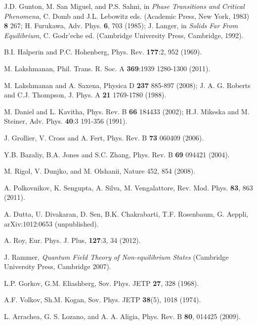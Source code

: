 \documentclass[a4paper,11pt,color]{article}
\renewenvironment{thebibliography}[1]{%
    \begin{oldthebibliography}{#1}%
      \setlength{\parskip}{0ex}%
      \setlength{\itemsep}{0ex}%
  }%
  {%
    \end{oldthebibliography}%
  }
\begin{document}
      
%
%
\begin{thebibliography}{}

J.D. Gunton, M. San Miguel, and P.S. Sahni, in \textit{Phase Transitions and Critical Phenomena}, C. Domb
and J.L. Lebowitz eds. (Academic Press, New York, 1983)  {\bf 8} 267; H. Furukawa, Adv. Phys. {\bf 6}, 703 (1985);
J. Langer, in \textit{Solids Far From Equilibrium}, C. Godr'eche ed. (Cambridge University Press, Cambridge, 1992).

B.I. Halperin and P.C. Hohenberg, Phys. Rev. {\bf 177}:2, 952 (1969).

M. Lakshmanan,  Phil. Trans. R. Soc. A {\bf 369}:1939 1280-1300 (2011).

M. Lakshmanan and A. Saxena, Physica D {\bf 237} 885-897 (2008); J. A. G. Roberts and C.J. Thompson, J. Phys. A {\bf 21} 1769-1780 (1988).

M. Daniel and L. Kavitha, Phys. Rev. B {\bf 66} 184433 (2002); H.J. Mikeska and M. Steiner, Adv. Phys. {\bf40}:3 191-356 (1991). 

J. Grollier, V. Cross  and A. Fert, Phys. Rev. B {\bf 73} 060409 (2006).

Y.B. Bazaliy, B.A. Jones and S.C. Zhang, Phys. Rev. B {\bf 69} 094421 (2004).

M. Rigol, V. Dunjko, and M. Olshanii, Nature 452, 854 (2008).

A. Polkovnikov, K. Sengupta, A. Silva, M. Vengalattore, Rev. Mod. Phys. \textbf{83}, 863 (2011).

A. Dutta, U. Divakaran, D. Sen, B.K. Chakrabarti, T.F. Rosenbaum, G. Aeppli, arXiv:1012:0653 (unpublished).

A. Roy, Eur. Phys. J. {Plus}, {\bf 127}:3, 34 (2012).

J. Rammer, \textit{Quantum Field Theory of Non-equilibrium States} (Cambridge University Press, Cambridge 2007).

L.P. Gorkov, G.M. Eliashberg, Sov. Phys. JETP \textbf{27}, 328 (1968).

A.F. Volkov, Sh.M. Kogan, Sov. Phys. JETP \textbf{38}(5), 1018 (1974).

L. Arrachea, G. S. Lozano, and A. A. Aligia, Phys. Rev. B {\bf 80}, 014425 (2009).


\end{thebibliography}
\end{document}
